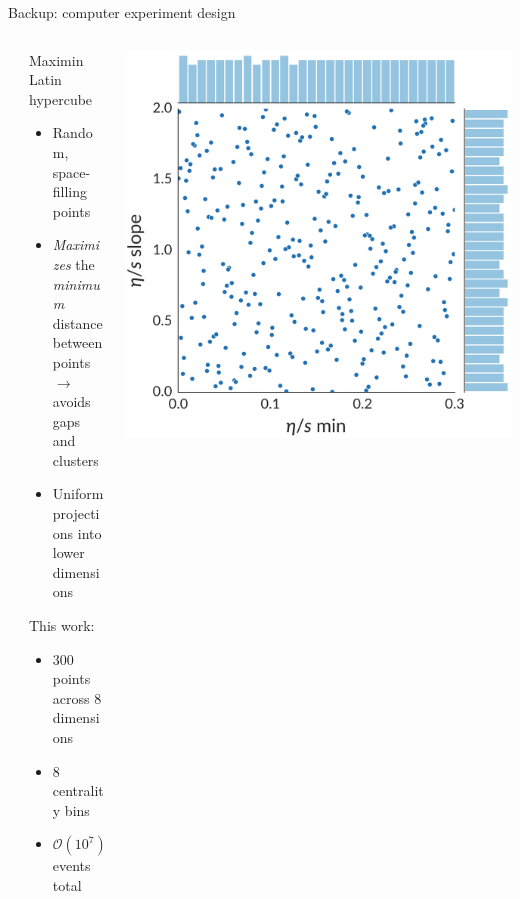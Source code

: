 \documentclass[xcolor=dvipsnames, aspectratio=169]{beamer}
\begin{document}
\begin{frame}{Backup: computer experiment design}
    \begin{columns}
    \begin{column}{0.05\textwidth} 
    \end{column}
    \begin{column}{0.47\textwidth} 
        Maximin Latin hypercube
        \begin{itemize}
            \item Random, space-filling points
            \item \emph{Maximizes} the \emph{minimum}\\
                distance between points\\
                $\rightarrow$ avoids gaps and clusters
            \item Uniform projections into\\
                lower dimensions
        \end{itemize}
        \medskip
        This work:
        \begin{itemize}
            \item 300 points across 8\\
                dimensions
            \item 8 centrality bins
            \item $\mathcal{O}(10^7)$ events total
        \end{itemize}
    \end{column}
    \begin{column}{0.48\textwidth}
        \flushleft 
        \includegraphics[width=\textwidth]{design}
    \end{column}
    \end{columns}
\end{frame}
\end{document}
